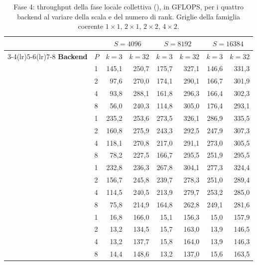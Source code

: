 \begin{table}[H]
\centering
\footnotesize
\caption{Fase 4: throughput della fase locale collettiva
(), in GFLOPS, per i quattro backend al variare
della scala e del numero di rank. Griglie della famiglia coerente
$1\times1$, $2\times1$, $2\times2$, $4\times2$.}
\label{tab:ris-fase4-rank}
\begin{tabular}{@{}llrrrrrr@{}}
\toprule
& & \multicolumn{2}{c}{$S=4096$} & \multicolumn{2}{c}{$S=8192$} & \multicolumn{2}{c}{$S=\num{16384}$} \\
\cmidrule(lr){3-4}\cmidrule(lr){5-6}\cmidrule(lr){7-8}
\textbf{Backend} & $P$ & $k=3$ & $k=32$ & $k=3$ & $k=32$ & $k=3$ & $k=32$ \\
\midrule

\multirow{4}{*}{{cuda\_naive}}
& 1 & 145,1 & 250,7 & 175,7 & 327,1 & 146,6 & 331,3 \\
& 2 & 97,6 & 270,0 & 174,1 & 290,1 & 166,7 & 301,9 \\
& 4 & 93,8 & 288,1 & 161,8 & 296,3 & 166,4 & 302,3 \\
& 8 & 56,0 & 240,3 & 114,8 & 305,0 & 176,4 & 293,1 \\

\midrule

\multirow{4}{*}{{cuda\_warp}}
& 1 & 235,2 & 253,6 & 273,5 & 326,1 & 286,9 & 335,5 \\
& 2 & 160,8 & 275,9 & 243,3 & 292,5 & 247,9 & 307,3 \\
& 4 & 118,1 & 270,8 & 217,0 & 291,1 & 273,0 & 305,5 \\
& 8 & 78,2 & 227,5 & 166,7 & 295,5 & 251,9 & 295,5 \\

\midrule

\multirow{4}{*}{{cuda\_warp\_smem}}
& 1 & 232,8 & 236,3 & 267,8 & 304,1 & 277,3 & 324,4 \\
& 2 & 156,7 & 245,8 & 239,7 & 278,3 & 251,0 & 289,4 \\
& 4 & 114,5 & 240,5 & 213,9 & 279,7 & 253,2 & 285,0 \\
& 8 & 75,8 & 214,9 & 164,8 & 262,8 & 249,1 & 281,6 \\

\midrule

\multirow{4}{*}{{cublas}}
& 1 & 16,8 & 166,0 & 15,1 & 156,3 & 15,0 & 157,9 \\
& 2 & 13,2 & 134,5 & 15,7 & 163,0 & 13,9 & 146,5 \\
& 4 & 13,2 & 137,7 & 15,8 & 164,0 & 13,9 & 146,3 \\
& 8 & 14,4 & 148,6 & 13,2 & 137,0 & 15,6 & 163,5 \\

\bottomrule
\end{tabular}
\end{table}

